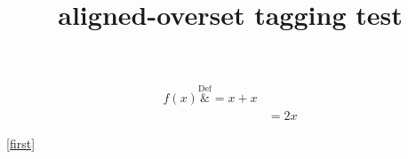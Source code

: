 \documentclass{article}
\title{aligned-overset tagging test}
\begin{document}
\begin{align}
f(x)\overset{\text{Def}}&=x+x \label{first}\\
&=2x
\end{align}

\eqref{first}
\end{document}
